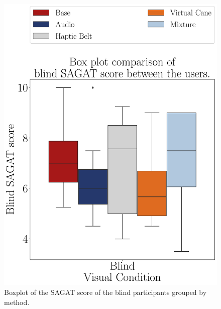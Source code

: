 \begin{figure}[!htb]
    \centering
    \begin{minipage}{0.45\textwidth}
        \centering
        \includegraphics[width = \textwidth]{Resultados/Sagat/Figuras/pdf/boxplot_sagat_blind_scene.pdf}
        \caption{Boxplot of the SAGAT score of the blind participants grouped by method.}
        \label{fig:boxplot_sagat_blind_scene}
    \end{minipage}
    \begin{minipage}{0.075\textwidth}
        \hfill
    \end{minipage}
    \begin{minipage}{0.45\textwidth}
        \centering

\end{minipage}
\end{figure}
